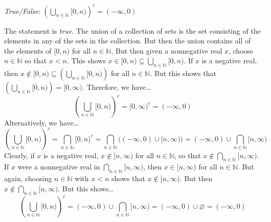 \documentclass[11pt,letterpaper]{article}
\begin{document}
\newpage



\quizsol \textit{True/False}: $\displaystyle \left( \bigcup_{n \in \mathbb{N}} [0, n) \right)^c= (-\infty, 0)$ \pspace

\sol The statement is \textit{true}. The union of a collection of sets is the set consisting of the elements in any of the sets in the collection. But then the union contains all of the elements of $[0, n)$ for all $n \in \mathbb{N}$. But then given a nonnegative real $x$, choose $n \in \mathbb{N}$ so that $x < n$. This shows $x \in [0, n) \subseteq \displaystyle \bigcup_{n \in \mathbb{N}} [0, n)$. If $x$ is a negative real, then $x \notin [0, n) \subseteq \displaystyle \left( \bigcup_{n \in \mathbb{N}} [0, n) \right)$ for all $n \in \mathbb{N}$. But this shows that $\displaystyle \left( \bigcup_{n \in \mathbb{N}} [0, n) \right)= [0, \infty)$. Therefore, we have\dots
	\[
	\displaystyle \left( \bigcup_{n \in \mathbb{N}} [0, n) \right)^c= [0, \infty)^c= (-\infty, 0)
	\]
Alternatively, we have\dots
	\[
	\displaystyle \left( \bigcup_{n \in \mathbb{N}} [0, n) \right)^c= \bigcap_{n \in \mathbb{N}} [0, n)^c= \bigcap_{n \in \mathbb{N}} \bigg( (-\infty, 0) \cup [n, \infty) \bigg)= (-\infty, 0) \cup \bigcap_{n \in \mathbb{N}} [n, \infty)
	\]
Clearly, if $x$ is a negative real, $x \notin [n, \infty)$ for all $n \in \mathbb{N}$, so that $x \notin \displaystyle \bigcap_{n \in \mathbb{N}} [n, \infty)$. If $x$ were a nonnegative real in $\displaystyle \bigcap_{n \in \mathbb{N}} [n, \infty)$, then $x \in [n, \infty)$ for all $n \in \mathbb{N}$. But again, choosing $n \in \mathbb{N}$ with $x < n$ shows that $x \notin [n, \infty)$. But then $x \notin \displaystyle \bigcap_{n \in \mathbb{N}} [n, \infty)$. But this shows\dots 
	\[
	\displaystyle \left( \bigcup_{n \in \mathbb{N}} [0, n) \right)^c= (-\infty, 0) \cup \bigcap_{n \in \mathbb{N}} [n, \infty)= (-\infty, 0) \cup \varnothing= (-\infty, 0)
	\]
\end{document}
